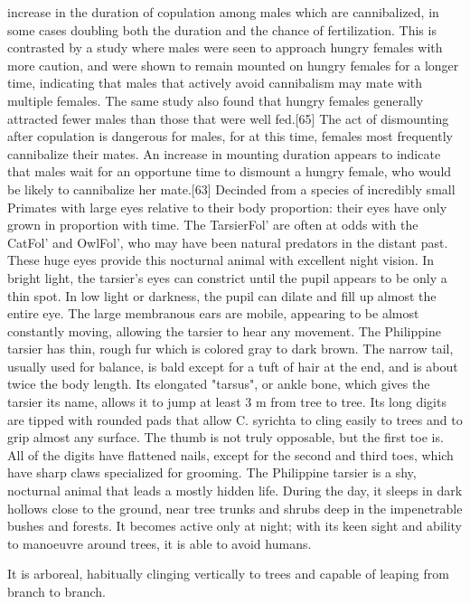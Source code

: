 \documentclass[twoside, 12pt, letterpaper]{report}\usepackage[]{graphicx}\usepackage[]{color}
\begin{document}
\begin{multicols*}{2}
increase in the duration of copulation among males which are cannibalized, in some cases doubling both the duration and the chance of fertilization. This is contrasted by a study where males were seen to approach hungry females with more caution, and were shown to remain mounted on hungry females for a longer time, indicating that males that actively avoid cannibalism may mate with multiple females. The same study also found that hungry females generally attracted fewer males than those that were well fed.[65] The act of dismounting after copulation is dangerous for males, for at this time, females most frequently cannibalize their mates. An increase in mounting duration appears to indicate that males wait for an opportune time to dismount a hungry female, who would be likely to cannibalize her mate.[63]
\nsubsection{\tarsier}
Decinded from a species of incredibly small Primates with large eyes relative to their body proportion: their eyes have only grown in proportion with time. The TarsierFol' are often at odds with the CatFol' and OwlFol', who may have been natural predators in the distant past. These huge eyes provide this nocturnal animal with excellent night vision. In bright light, the tarsier's eyes can constrict until the pupil appears to be only a thin spot. In low light or darkness, the pupil can dilate and fill up almost the entire eye. The large membranous ears are mobile, appearing to be almost constantly moving, allowing the tarsier to hear any movement. The Philippine tarsier has thin, rough fur which is colored gray to dark brown. The narrow tail, usually used for balance, is bald except for a tuft of hair at the end, and is about twice the body length. Its elongated "tarsus", or ankle bone, which gives the tarsier its name, allows it to jump at least 3 m from tree to tree. Its long digits are tipped with rounded pads that allow C. syrichta to cling easily to trees and to grip almost any surface. The thumb is not truly opposable, but the first toe is. All of the digits have flattened nails, except for the second and third toes, which have sharp claws specialized for grooming. The Philippine tarsier is a shy, nocturnal animal that leads a mostly hidden life. During the day, it sleeps in dark hollows close to the ground, near tree trunks and shrubs deep in the impenetrable bushes and forests. It becomes active only at night; with its keen sight and ability to manoeuvre around trees, it is able to avoid humans.

It is arboreal, habitually clinging vertically to trees and capable of leaping from branch to branch.


\end{multicols*}
\end{document}
